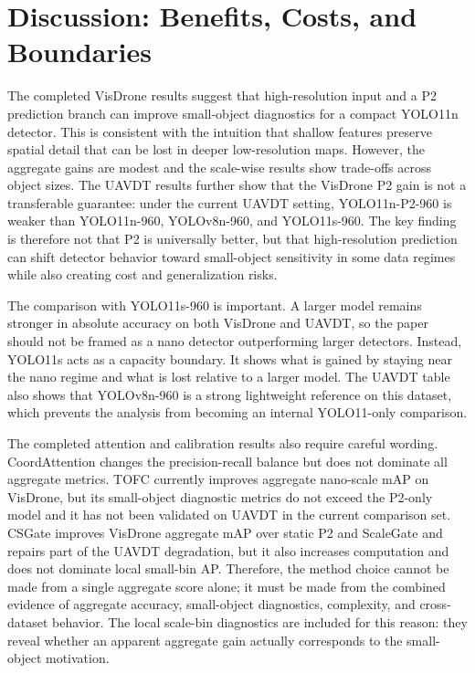 \documentclass[journal]{IEEEtran}
\begin{document}
\section{Discussion: Benefits, Costs, and Boundaries}

The completed VisDrone results suggest that high-resolution input and a P2 prediction branch can improve small-object diagnostics for a compact YOLO11n detector. This is consistent with the intuition that shallow features preserve spatial detail that can be lost in deeper low-resolution maps. However, the aggregate gains are modest and the scale-wise results show trade-offs across object sizes. The UAVDT results further show that the VisDrone P2 gain is not a transferable guarantee: under the current UAVDT setting, YOLO11n-P2-960 is weaker than YOLO11n-960, YOLOv8n-960, and YOLO11s-960. The key finding is therefore not that P2 is universally better, but that high-resolution prediction can shift detector behavior toward small-object sensitivity in some data regimes while also creating cost and generalization risks.

The comparison with YOLO11s-960 is important. A larger model remains stronger in absolute accuracy on both VisDrone and UAVDT, so the paper should not be framed as a nano detector outperforming larger detectors. Instead, YOLO11s acts as a capacity boundary. It shows what is gained by staying near the nano regime and what is lost relative to a larger model. The UAVDT table also shows that YOLOv8n-960 is a strong lightweight reference on this dataset, which prevents the analysis from becoming an internal YOLO11-only comparison.

The completed attention and calibration results also require careful wording. CoordAttention changes the precision-recall balance but does not dominate all aggregate metrics. TOFC currently improves aggregate nano-scale mAP on VisDrone, but its small-object diagnostic metrics do not exceed the P2-only model and it has not been validated on UAVDT in the current comparison set. CSGate improves VisDrone aggregate mAP over static P2 and ScaleGate and repairs part of the UAVDT degradation, but it also increases computation and does not dominate local small-bin AP. Therefore, the method choice cannot be made from a single aggregate score alone; it must be made from the combined evidence of aggregate accuracy, small-object diagnostics, complexity, and cross-dataset behavior. The local scale-bin diagnostics are included for this reason: they reveal whether an apparent aggregate gain actually corresponds to the small-object motivation.
\end{document}
